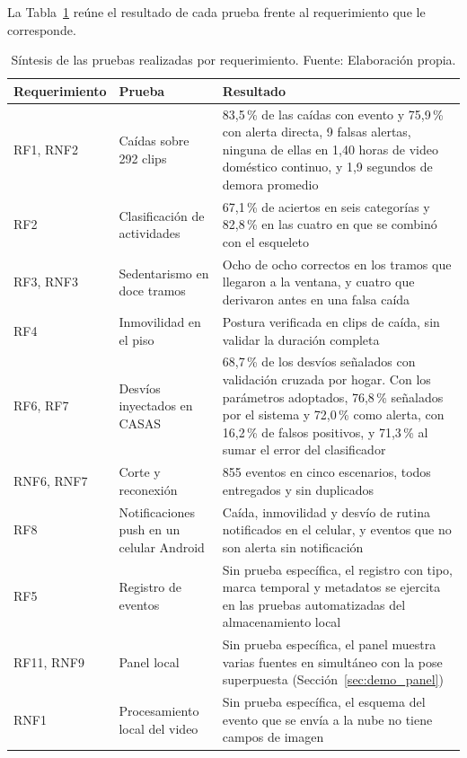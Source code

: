 La Tabla~\ref{tab:sintesis_pruebas} reúne el resultado de cada prueba frente al requerimiento que le corresponde.

\begin{table}[H]
\centering
\caption[Síntesis de las pruebas realizadas por requerimiento.]{Síntesis de las pruebas realizadas por requerimiento. Fuente: Elaboración propia.}
\label{tab:sintesis_pruebas}
\small
\begin{tabular}{@{}p{2.5cm}p{4.6cm}p{7.3cm}@{}}
\toprule
\textbf{Requerimiento} & \textbf{Prueba} & \textbf{Resultado} \\
\midrule
RF1, RNF2 & Caídas sobre 292 clips & 83,5\,\% de las caídas con evento y 75,9\,\% con alerta directa, 9 falsas alertas, ninguna de ellas en 1,40 horas de video doméstico continuo, y 1,9 segundos de demora promedio \\
RF2 & Clasificación de actividades & 67,1\,\% de aciertos en seis categorías y 82,8\,\% en las cuatro en que se combinó con el esqueleto \\
RF3, RNF3 & Sedentarismo en doce tramos & Ocho de ocho correctos en los tramos que llegaron a la ventana, y cuatro que derivaron antes en una falsa caída \\
RF4 & Inmovilidad en el piso & Postura verificada en clips de caída, sin validar la duración completa \\
RF6, RF7 & Desvíos inyectados en CASAS & 68,7\,\% de los desvíos señalados con validación cruzada por hogar. Con los parámetros adoptados, 76,8\,\% señalados por el sistema y 72,0\,\% como alerta, con 16,2\,\% de falsos positivos, y 71,3\,\% al sumar el error del clasificador \\
RNF6, RNF7 & Corte y reconexión & 855 eventos en cinco escenarios, todos entregados y sin duplicados \\
RF8 & Notificaciones push en un celular Android & Caída, inmovilidad y desvío de rutina notificados en el celular, y eventos que no son alerta sin notificación \\
RF5 & Registro de eventos & Sin prueba específica, el registro con tipo, marca temporal y metadatos se ejercita en las pruebas automatizadas del almacenamiento local \\
RF11, RNF9 & Panel local & Sin prueba específica, el panel muestra varias fuentes en simultáneo con la pose superpuesta (Sección~\ref{sec:demo_panel}) \\
RNF1 & Procesamiento local del video & Sin prueba específica, el esquema del evento que se envía a la nube no tiene campos de imagen \\

\end{tabular}
\end{table}
